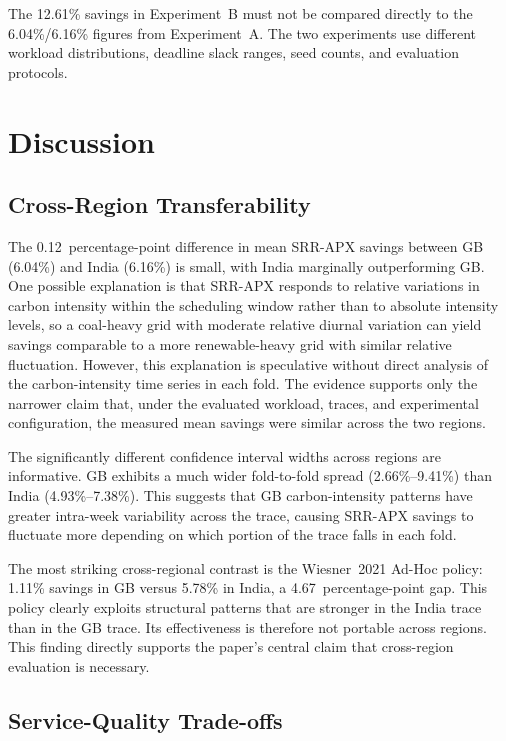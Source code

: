 \documentclass[conference]{IEEEtran}
\begin{document}
The 12.61\% savings in Experiment~B must not be compared directly to the
6.04\%/6.16\% figures from Experiment~A. The two experiments use different
workload distributions, deadline slack ranges, seed counts, and evaluation
protocols.

\section{Discussion}
\label{sec:discussion}

\subsection{Cross-Region Transferability}

The 0.12~percentage-point difference in mean SRR-APX savings between GB
(6.04\%) and India (6.16\%) is small, with India marginally outperforming GB.
One possible explanation is that SRR-APX responds to relative variations in
carbon intensity within the scheduling window rather than to absolute intensity
levels, so a coal-heavy grid with moderate relative diurnal variation can yield
savings comparable to a more renewable-heavy grid with similar relative
fluctuation. However, this explanation is speculative without direct analysis
of the carbon-intensity time series in each fold. The evidence supports only
the narrower claim that, under the evaluated workload, traces, and experimental
configuration, the measured mean savings were similar across the two regions.

The significantly different confidence interval widths across regions are
informative. GB exhibits a much wider fold-to-fold spread (2.66\%--9.41\%) than
India (4.93\%--7.38\%). This suggests that GB carbon-intensity patterns have
greater intra-week variability across the trace, causing SRR-APX savings to
fluctuate more depending on which portion of the trace falls in each fold.

The most striking cross-regional contrast is the Wiesner~2021 Ad-Hoc policy:
1.11\% savings in GB versus 5.78\% in India, a 4.67~percentage-point gap.
This policy clearly exploits structural patterns that are stronger in the
India trace than in the GB trace. Its effectiveness is therefore not portable
across regions. This finding directly supports the paper's central claim that
cross-region evaluation is necessary.

\subsection{Service-Quality Trade-offs}
\end{document}
